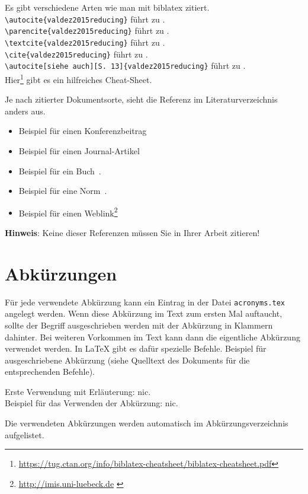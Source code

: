 Es gibt verschiedene Arten wie man mit biblatex zitiert.\\
\noindent
\texttt{\textbackslash autocite\{valdez2015reducing\}} führt zu \autocite{valdez2015reducing}.\\
\texttt{\textbackslash parencite\{valdez2015reducing\}} führt zu \parencite{valdez2015reducing}.\\
\texttt{\textbackslash textcite\{valdez2015reducing\}} führt zu \textcite{valdez2015reducing}.\\
\texttt{\textbackslash cite\{valdez2015reducing\}} führt zu \cite{valdez2015reducing}.\\
\texttt{\textbackslash autocite[siehe auch][S. 13]\{valdez2015reducing\}} führt zu \autocite[siehe auch][S.~13]{valdez2015reducing}.\\

Hier\footnote{\url{https://tug.ctan.org/info/biblatex-cheatsheet/biblatex-cheatsheet.pdf}} gibt es ein hilfreiches Cheat-Sheet.

Je nach zitierter Dokumentsorte, sieht die Referenz im Literaturverzeichnis anders aus.
\begin{itemize}
    \item Beispiel für einen Konferenzbeitrag \autocite{Nielsen1990}
    \item Beispiel für einen Journal-Artikel \autocite{hollan2000}
    \item Beispiel für ein Buch~\autocite{zobel2014writing}.
    \item Beispiel für eine Norm~\autocite{ISO9241}.
    \item Beispiel für einen Weblink\footnote{{\url{http://imis.uni-luebeck.de}} \autocite{webimis}}
\end{itemize}

\textbf{Hinweis}: Keine dieser Referenzen müssen Sie in Ihrer Arbeit zitieren!

\section{Abkürzungen}
Für jede verwendete Abkürzung kann ein Eintrag in der Datei \texttt{acronyms.tex} angelegt werden. Wenn diese Abkürzung im Text zum ersten Mal auftaucht, sollte der Begriff ausgeschrieben werden mit der Abkürzung in Klammern dahinter. Bei weiteren Vorkommen im Text kann dann die eigentliche Abkürzung verwendet werden. In \LaTeX{} gibt es dafür spezielle Befehle. Beispiel für ausgeschriebene Abkürzung (siehe Quelltext des Dokuments für die entsprechenden Befehle).

Erste Verwendung mit Erläuterung: \acrfull{nic}.\\ 
Beispiel für das Verwenden der Abkürzung: \acrshort{nic}. 

Die verwendeten Abkürzungen werden automatisch im Abkürzungsverzeichnis aufgelistet.


